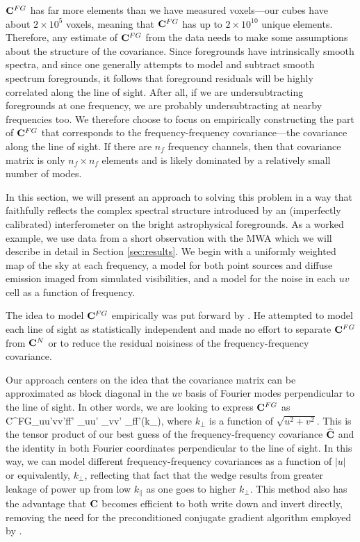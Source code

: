 $\mathbf{C}^{FG}$ has far more elements than we have measured voxels---our cubes have about $2\times 10^5$ voxels, meaning that $\mathbf{C}^{FG}$ has up to $2\times 10^{10}$ unique elements. Therefore, any estimate of $\mathbf{C}^{FG}$ from the data needs to make some assumptions about the structure of the covariance. Since foregrounds have intrinsically smooth spectra, and since one generally attempts to model and subtract smooth spectrum foregrounds, it follows that foreground residuals will be highly correlated along the line of sight. After all, if we are undersubtracting foregrounds at one frequency, we are probably undersubtracting at nearby frequencies too. We therefore choose to focus on empirically constructing the part of $\mathbf{C}^{FG}$ that corresponds to the frequency-frequency covariance---the covariance along the line of sight.  If there are $n_f$ frequency channels, then that covariance matrix is only $n_f \times n_f$ elements and is likely dominated by a relatively small number of modes. 

In this section, we will present an approach to solving this problem in a way that faithfully reflects the complex spectral structure introduced by an (imperfectly calibrated) interferometer on the bright astrophysical foregrounds. As a worked example, we use data from a short observation with the MWA which we will describe in detail in Section \ref{sec:results}. We begin with a uniformly weighted map of the sky at each frequency, a model for both point sources and diffuse emission imaged from simulated visibilities, and a model for the noise in each $uv$ cell as a function of frequency.

The idea to model $\mathbf{C}^{FG}$ empirically was put forward by \citet{LiuThesis}. He attempted to model each line of sight as statistically independent and made no effort to separate $\mathbf{C}^{FG}$ from $\mathbf{C}^{N}$ or to reduce the residual noisiness of the frequency-frequency covariance.  

Our approach centers on the idea that the covariance matrix can be approximated as block diagonal in the $uv$ basis of Fourier modes perpendicular to the line of sight. In other words, we are looking to express $\mathbf{C}^{FG}$ as
\beq
C^{FG}_{uu'vv'ff'} \approx \delta_{uu'} \delta_{vv'} _{ff'}(k_\perp), \label{eq:blockdiag}
\eeq
where $k_\perp$ is a function of $\sqrt{u^2+v^2}$. This is the tensor product of our best guess of the frequency-frequency covariance $\widehat{\mathbf{C}}$ and the identity in both Fourier coordinates perpendicular to the line of sight. In this way, we can model different frequency-frequency covariances as a function of $|u|$ or equivalently, $k_\perp$, reflecting that fact that the wedge results from greater leakage of power up from low $k_{\|}$ as one goes to higher $k_\perp$. This method also has the advantage that $\mathbf{C}$ becomes efficient to both write down and invert directly, removing the need for the preconditioned conjugate gradient algorithm employed by \citet{DillonFast}.

